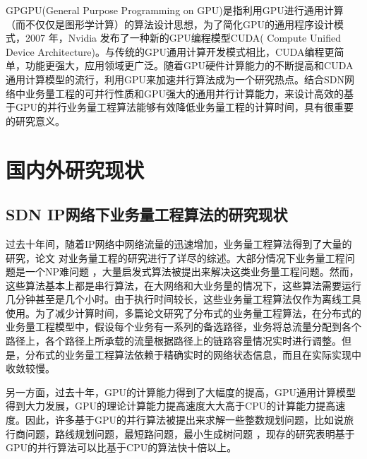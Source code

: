 \documentclass[master]{thesis-uestc}
\begin{document}
GPGPU(General Purpose Programming on GPU)是指利用GPU进行通用计算（而不仅仅是图形学计算）的算法设计思想，为了简化GPU的通用程序设计模式，2007 年，Nvidia 发布了一种新的GPU编程模型CUDA( Compute Unified Device Architecture)。与传统的GPU通用计算开发模式相比，CUDA编程更简单，功能更强大，应用领域更广泛。随着GPU硬件计算能力的不断提高和CUDA通用计算模型的流行，利用GPU来加速并行算法成为一个研究热点。结合SDN网络中业务量工程的可并行性质和GPU强大的通用并行计算能力，来设计高效的基于GPU的并行业务量工程算法能够有效降低业务量工程的计算时间，具有很重要的研究意义。



\section{国内外研究现状}
\subsection{SDN IP网络下业务量工程算法的研究现状}
过去十年间，随着IP网络中网络流量的迅速增加，业务量工程算法得到了大量的研究，论文 对业务量工程的研究进行了详尽的综述。大部分情况下业务量工程问题是一个NP难问题 ，大量启发式算法被提出来解决这类业务量工程问题。然而，这些算法基本上都是串行算法，在大网络和大业务量的情况下，这些算法需要运行几分钟甚至是几个小时。由于执行时间较长，这些业务量工程算法仅作为离线工具使用。为了减少计算时间，多篇论文研究了分布式的业务量工程算法，在分布式的业务量工程模型中，假设每个业务有一系列的备选路径，业务将总流量分配到各个路径上，各个路径上所承载的流量根据路径上的链路容量情况实时进行调整。但是，分布式的业务量工程算法依赖于精确实时的网络状态信息，而且在实际实现中收敛较慢。

另一方面，过去十年，GPU的计算能力得到了大幅度的提高，GPU通用计算模型得到大力发展，GPU的理论计算能力提高速度大大高于CPU的计算能力提高速度。因此，许多基于GPU的并行算法被提出来求解一些整数规划问题，比如说旅行商问题，路线规划问题，最短路问题，最小生成树问题 ，现存的研究表明基于GPU的并行算法可以比基于CPU的算法快十倍以上。
\end{document}
